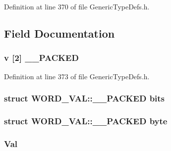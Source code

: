 Definition at line 370 of file Generic\+Type\+Defs.\+h.



\subsection{Field Documentation}
\hypertarget{union_w_o_r_d___v_a_l_acc68fd0f17b26e2eea3d31b1728de49d}{}
\subsubsection[{\+\_\+\+\_\+\+P\+A\+C\+K\+E\+D}]{ {\bf v} \mbox{[}2\mbox{]} {\bf \+\_\+\+\_\+\+P\+A\+C\+K\+E\+D}}\label{union_w_o_r_d___v_a_l_acc68fd0f17b26e2eea3d31b1728de49d}


Definition at line 373 of file Generic\+Type\+Defs.\+h.

\hypertarget{union_w_o_r_d___v_a_l_afe1c6a255c865d41d5a8f80b5b4333f3}{}
\subsubsection[{bits}]{\setlength{\rightskip}{0pt plus 5cm}struct {\bf W\+O\+R\+D\+\_\+\+V\+A\+L\+::\+\_\+\+\_\+\+P\+A\+C\+K\+E\+D}  bits}\label{union_w_o_r_d___v_a_l_afe1c6a255c865d41d5a8f80b5b4333f3}
\hypertarget{union_w_o_r_d___v_a_l_affe411730a20123ff692e4981dd6c916}{}
\subsubsection[{byte}]{\setlength{\rightskip}{0pt plus 5cm}struct {\bf W\+O\+R\+D\+\_\+\+V\+A\+L\+::\+\_\+\+\_\+\+P\+A\+C\+K\+E\+D}  byte}\label{union_w_o_r_d___v_a_l_affe411730a20123ff692e4981dd6c916}
\hypertarget{union_w_o_r_d___v_a_l_aa498550e7f87da9a38dc71609652e6bd}{}
\subsubsection[{Val}]{ Val}\label{union_w_o_r_d___v_a_l_aa498550e7f87da9a38dc71609652e6bd}


